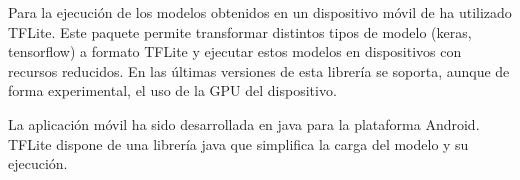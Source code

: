 Para la ejecución de los modelos obtenidos en un dispositivo móvil de ha utilizado TFLite. Este paquete permite transformar distintos tipos de modelo (keras, tensorflow) a formato TFLite y ejecutar estos modelos en dispositivos con recursos reducidos. En las últimas versiones de esta librería se soporta, aunque de forma experimental, el uso de la GPU del dispositivo.

La aplicación móvil ha sido desarrollada en java para la plataforma Android. TFLite dispone de una librería java que simplifica la carga del modelo y su ejecución.